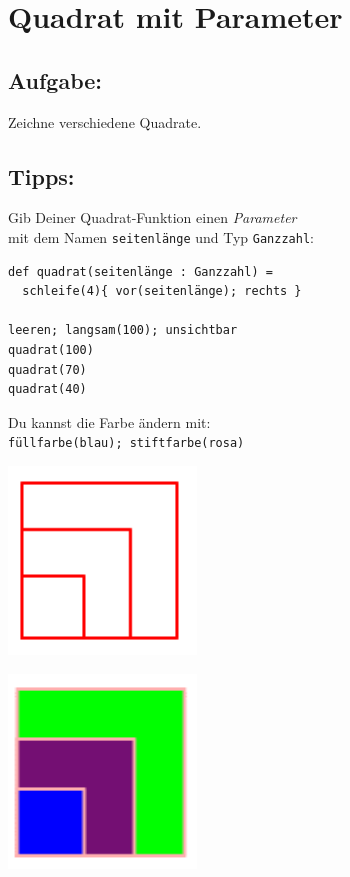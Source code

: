 \chapter{Quadrat mit Parameter}
\begin{multicols}{2}
\section*{\color{BrickRed}Aufgabe:}
Zeichne verschiedene Quadrate.
\section*{\color{OliveGreen}Tipps:}
Gib Deiner Quadrat-Funktion einen {\it Parameter}\\
mit dem Namen \lstinline{seitenlänge} und Typ \lstinline{Ganzzahl}:

\begin{lstlisting}[basicstyle={\ttfamily\fontsize{16}{19}\selectfont},numbers=none]
def quadrat(seitenlänge : Ganzzahl) = 
  schleife(4){ vor(seitenlänge); rechts }

leeren; langsam(100); unsichtbar
quadrat(100) 
quadrat(70)
quadrat(40)
\end{lstlisting}
        
Du kannst die Farbe ändern mit:\\
\lstinline{füllfarbe(blau); stiftfarbe(rosa)}


\columnbreak


\begin{center}
\includegraphics[width=5.0cm]{../img/square-param.png}
\end{center}

\begin{center}
\includegraphics[width=5.0cm]{../img/square-param-color.png}
\end{center}

\end{multicols}

